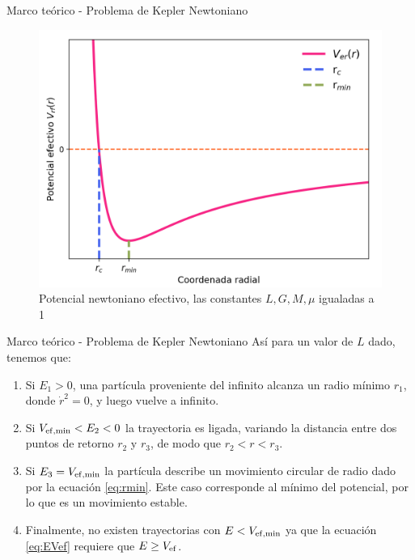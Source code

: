 \begin{frame}{Marco teórico - Problema de Kepler Newtoniano}
    \vspace{0.4cm}
    \begin{figure}[H]
        \centering
        \includegraphics[scale=0.5]{images/Pot_efe.png}
        \caption{Potencial newtoniano efectivo, las constantes $L,G,M,\mu$ igualadas a 1}
        \label{fig:pot}
    \end{figure}
\end{frame}
\begin{frame}{Marco teórico - Problema de Kepler Newtoniano}
    Así para un valor de $L$ dado, tenemos que:
\begin{enumerate}
    \item Si $E_1>0$, una partícula proveniente del infinito alcanza un radio
    mínimo $r_1$, donde $\dot{r}^2=0$, y luego vuelve a infinito.
    \item Si $V_{\rm ef, min}<E_2<0$ la trayectoria es ligada, variando la distancia entre dos puntos de retorno $r_2$ y $r_3$, de modo que $r_2<r<r_{3}$.
    \item Si $E_{3}=V_{\rm ef, min}$ la partícula
    describe un movimiento circular de radio dado por la ecuación \ref{eq:rmin}. Este caso
    corresponde al mínimo del potencial, por lo que es un
    movimiento estable.
    \item Finalmente, no existen trayectorias con $E<V_{\rm ef, min}$ ya que la ecuación \ref{eq:EVef} requiere que $E\ge V_{\rm ef}$.
\end{enumerate}
\end{frame}
